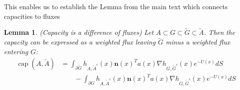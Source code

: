 \documentclass[english, aip, jcp, priprint, graphicx,floatfix]{revtex4-1}
\newtheorem{lemma}{Lemma}
\theoremstyle{plain}
\theoremstyle{definition}
\theoremstyle{plain}
\begin{document}
This enables us to establish the Lemma from the main text which connects capacities to fluxes

\begingroup
\def\thelemma{\ref{lem:capacity_lemma}}
\begin{lemma}(Capacity is a difference of fluxes)  Let $A\subset G \subset \tilde G \subset \tilde A$.  Then the capacity can be expressed as a weighted flux leaving $\tilde G$ minus a weighted flux entering $G$:
\begin{align*}
\ensuremath{\operatorname{cap}} (A, \tilde{A}) &= \int_{\partial \tilde G}  h_{A, \tilde{A}^c} (x)   \textbf{n}(x)^T a (x) \nabla h_{G, \tilde{G}^c} (x)e^{- U (x)} dS \\
&\qquad - \int_{\partial G}  h_{A, \tilde{A}^c} (x)   \textbf{n}(x)^T a (x) \nabla h_{G, \tilde{G}^c} (x)e^{- U (x)} dS 
\end{align*}
\end{lemma}
\addtocounter{lemma}{-1}
\endgroup
\end{document}
